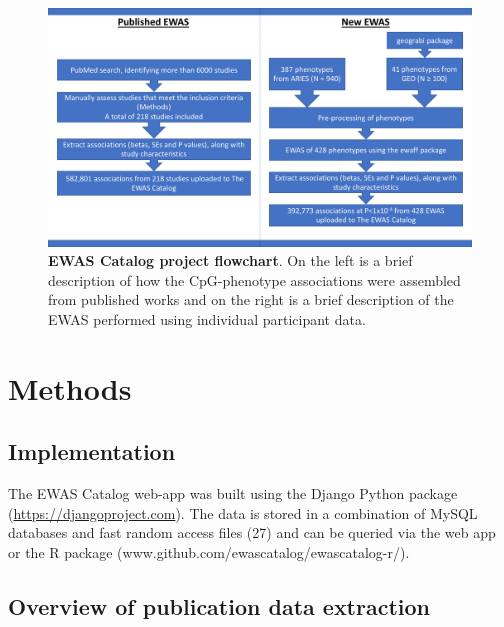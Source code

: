 \documentclass[11pt,twoside]{bristolthesis}
\begin{document}
\begin{figure}

{\centering \includegraphics[width=1\linewidth]{figure/03-ewas_catalog/project_flowchart} 

}

\caption[EWAS Catalog project flowchart]{\textbf{EWAS Catalog project flowchart}. On the left is a brief description of how the CpG-phenotype associations were assembled from published works and on the right is a brief description of the EWAS performed using individual participant data.}\label{fig:catalog-project-workflow}
\end{figure}
\hypertarget{methods-03}{%
\section{Methods}\label{methods-03}}

\hypertarget{implementation}{%
\subsection{Implementation}\label{implementation}}

The EWAS Catalog web-app was built using the Django Python package (\url{https://djangoproject.com}). The data is stored in a combination of MySQL databases and fast random access files (27) and can be queried via the web app or the R package (www.github.com/ewascatalog/ewascatalog-r/).

\hypertarget{overview-of-publication-data-extraction}{%
\subsection{Overview of publication data extraction}\label{overview-of-publication-data-extraction}}
\end{document}

